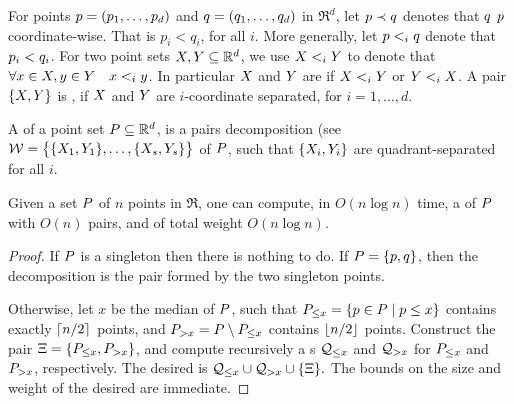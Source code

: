 \documentclass[12pt]{article}%
\begin{document}
For points $p = (p_1, \ldots, p_d)$ and $q = (q_1, \ldots, q_d)$
in $\Re^d$, let $p \prec q$ denotes that $q$ 
$p$ coordinate-wise. That is $p_i < q_i$, for all $i$. More
generally, let $p <_i q$ denote that $p_i < q_i$. For two
point sets $X, Y \subseteq \mathbb{R}^d$, we use $X <_i Y$ to
denote that $\forall x \in X, y \in Y \quad x <_i y$.
In particular $X$ and $Y$ are 
if $X <_i Y$ or $Y <_i X$. A pair $\{ X, Y\}$ is
, if $X$ and $Y$ are $i$-coordinate
separated, for $i=1,\ldots, d$.

A  of a point set
$P \subseteq \mathbb{R}^d$, is a pairs decomposition (see
$\mathcal{W} = \bigl\{ \{ X_1, Y_1 \}, \ldots, \{ X_s, Y_s \}
\bigr\}$ of $P$, such that $\{ X_i, Y_i\}$ are
quadrant-separated for all $i$.


\begin{lemma}
    Given a set $P$ of $n$ points in $\Re$, one can compute, in
    $O( n \log n)$ time, a \QSPD of $P$ with $O(n)$ pairs, and of
    total weight $O( n \log n)$.
\end{lemma}
\begin{proof}
    If $P$ is a singleton then there is nothing to do. If
    $P = \{ p, q \}$, then the decomposition is the pair formed
    by the two singleton points.

    Otherwise, let $x$ be the median of $P$, such that
    $P_{\leq x} = \left\{  p \in P  \;\middle\vert\; p \leq x \right\}$ contains exactly
    $\left\lceil {n/2} \right\rceil$ points, and $P_{> x} = P \setminus P_{\leq x}$
    contains $\left\lfloor {n/2} \right\rfloor$ points. Construct the pair
    $\Xi = \{ P_{\leq x}, P_{> x} \}$, and compute recursively a
    \QSPD{}s $\mathcal{Q}_{\leq x}$ and $\mathcal{Q}_{> x}$ for $P_{\leq x}$ and
    $P_{> x}$, respectively. The desired \QSPD is
    \begin{math}
        \mathcal{Q}_{\leq x} \cup \mathcal{Q}_{> x} \cup \{ \Xi \}.
    \end{math}
    The bounds on the size and weight of the desired \QSPD are
    immediate.
\end{proof}
\end{document}
